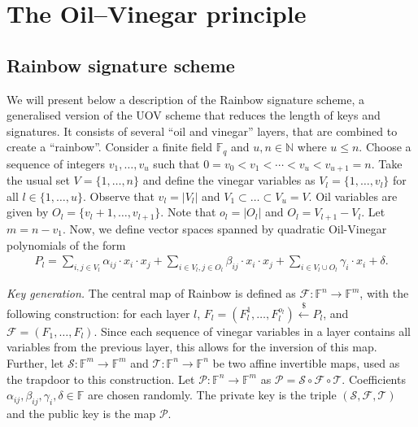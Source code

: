 \documentclass[openright]{report}
\newcommand{\random}{\stackrel{\$}{\longleftarrow}}
\begin{document}

\section{The Oil--Vinegar principle}\label{sec:oil}

\subsection{Rainbow signature scheme}\label{subsec:scheme}

We will present below a description of the Rainbow signature scheme, a
generalised version of the UOV scheme that reduces the length of keys and
signatures. It consists of several ``oil and vinegar'' layers, that are
combined to create a ``rainbow''. Consider a finite field $\mathbb{F}_{q}$ and
$u, n \in \mathbb{N}$ where $u \leq n$. Choose a sequence of integers
$v_{1}, \dots, v_{u}$ such that
$0 = v_{0} < v_{1} < \cdots < v_{u} < v_{u + 1} = n$. Take the usual set
$V = \{1, \dots, n\}$ and define the vinegar variables as
$V_{l} = \{1, \dots, v_{l}\}$ for all $l \in \{1, \dots, u\}$. Observe that
$v_{l} = |V_{l}|$ and $V_{1} \subset \dots \subset V_{u} = V$. Oil variables
are given by $O_{l} = \{v_{l} + 1, \dots, v_{l + 1}\}$. Note that
$o_{l} = |O_{l}|$ and $O_{l} = V_{l + 1} - V_{l}$. Let $m = n - v_{1}$. Now,
we define vector spaces spanned by quadratic Oil-Vinegar polynomials of the
form
\begin{align}
  P_{l} = \sum_{i, j \in V_{l}} \alpha_{ij} \cdot x_{i} \cdot x_{j}
    + \sum_{i \in V_{l}, j \in O_{l}} \beta_{ij} \cdot x_{i} \cdot x_{j}
    + \sum_{i \in V_{l} \cup O_{l}} \gamma_{i} \cdot x_{i} + \delta.
\end{align}

\emph{Key generation.} The central map of Rainbow is defined as
$\mathcal{F} : \mathbb{F}^{n} \longrightarrow \mathbb{F}^{m}$, with the
following construction: for each layer $l$,
$F_{l} = (F_{l}^{1}, \dots, F_{l}^{o_{l}}) \random{} P_{l}$,
and $\mathcal{F} = (F_{1}, \dots, F_{l})$. Since each sequence of vinegar
variables in a layer contains all variables from the previous layer, this
allows for the inversion of this map. Further, let
$\mathcal{S} : \mathbb{F}^{m} \longrightarrow \mathbb{F}^{m}$ and
$\mathcal{T} : \mathbb{F}^{n} \longrightarrow \mathbb{F}^{n}$ be two affine
invertible maps, used as the trapdoor to this construction. Let
$\mathcal{P} : \mathbb{F}^{n} \longrightarrow \mathbb{F}^{m}$ as
$\mathcal{P} = \mathcal{S} \circ \mathcal{F} \circ \mathcal{T}$.
Coefficients $\alpha_{ij}, \beta_{ij}, \gamma_{i}, \delta \in \mathbb{F}$ are
chosen randomly. The private key is the triple
$(\mathcal{S}, \mathcal{F}, \mathcal{T})$ and the public key is the map
$\mathcal{P}$.
\end{document}
